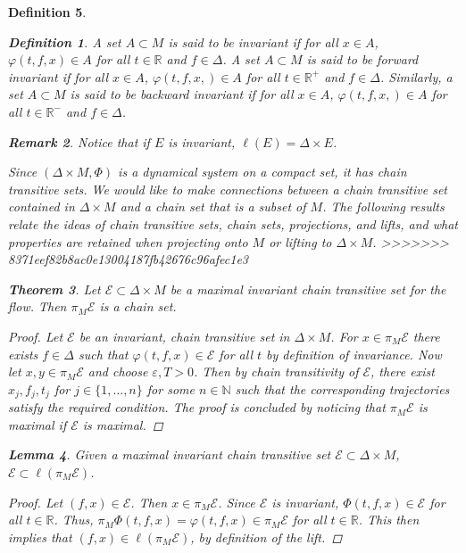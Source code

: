 \documentclass[11pt]{article}
\newtheorem{thm}{Theorem}
\newtheorem{defn}[thm]{Definition}
\newtheorem{lem}[thm]{Lemma}
\newtheorem{remark}[thm]{Remark}
\begin{document}
\begin{defn}
\begin{defn}
A set $A\subset M$ is said to be invariant if for all $x\in A$, $\varphi(t,f,x)\in A$ for all $t\in\mathbb{R}$ and $f\in\Delta$.
A set $A\subset M$ is said to be forward invariant if for all $x\in A$, $\varphi(t,f,x,)\in A$ for all $t\in \mathbb{R}^+$ and $f\in\Delta$.  Similarly, a set $A\subset M$ is said to be backward invariant if for all $x\in A$, $\varphi(t,f,x,)\in A$ for all $t\in \mathbb{R}^-$ and $f\in\Delta$.
\end{defn}


\begin{remark}
Notice that if $E$ is invariant, $\ell(E)=\Delta\times E$. 
\end{remark}

Since $(\Delta\times M,\Phi)$ is a dynamical system on a compact set, it has chain transitive sets.  We would like to make connections between a chain transitive set contained in $\Delta\times M$ and a chain set that is a subset of $M$.  The following results relate the ideas of chain transitive sets, chain sets, projections, and lifts, and what properties are retained when projecting onto $M$ or lifting to $\Delta\times M$. 
>>>>>>> 8371eef82b8ac0e13004187fb42676c96afec1e3


\begin{thm}\label{max chain set}
Let $\mathcal{E}\subset \Delta\times M$ be a maximal invariant chain transitive set for the flow.  Then $\pi_M\mathcal{E}$ is a chain set.
\end{thm}
\begin{proof}
Let $\mathcal{E}$ be an invariant, chain transitive set in $\Delta\times M$.  For $x\in\pi_M\mathcal{E}$ there exists $f\in\Delta$ such that $\varphi(t,f,x)\in\mathcal{E}$ for all $t$ by definition of invariance.  Now let $x,y\in \pi_M\mathcal{E}$ and choose $\varepsilon, T>0$.  Then by chain transitivity of $\mathcal{E}$, there exist $x_j, f_j, t_j$ for $j\in\{1,\ldots,n\}$ for some $n\in\mathbb{N}$ such that the corresponding trajectories satisfy the required condition.  The proof is concluded by noticing that $\pi_M\mathcal{E}$ is maximal if $\mathcal{E}$ is maximal.

\end{proof}

\begin{lem}\label{chain set subset}
Given a maximal invariant chain transitive set $\mathcal{E}\subset \Delta\times M$, $\mathcal{E}\subset\ell(\pi_M\mathcal{E})$.
\end{lem}
\begin{proof}
Let $(f,x)\in\mathcal{E}$.  Then $x\in \pi_M\mathcal{E}$.  Since $\mathcal{E}$ is invariant, $\Phi(t,f,x)\in \mathcal{E}$ for all $t\in\mathbb{R}$.  Thus, $\pi_M\Phi(t,f,x)=\varphi(t,f,x)\in\pi_M\mathcal{E}$ for all $t\in\mathbb{R}$.  This then implies that $(f,x)\in\ell(\pi_M\mathcal{E})$, by definition of the lift. 
\end{proof}



\end{defn}
\end{document}
